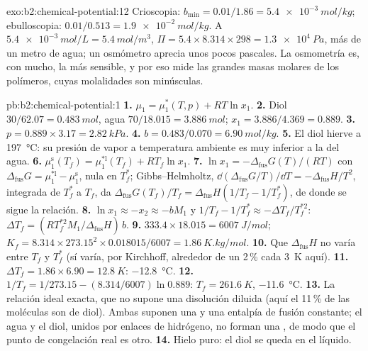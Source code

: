 \begin{solution}{exo:b2:chemical-potential:12}
Crioscopia: $b_{\min} = 0.01/1.86 = \qty{5.4e-3}{mol/kg}$; ebulloscopia:
$0.01/0.513 = \qty{1.9e-2}{mol/kg}$. A $\qty{5.4e-3}{mol/L} =
\qty{5.4}{mol/m^3}$, $\Pi = 5.4 \times 8.314 \times 298 = \qty{1.3e4}{Pa}$,
más de un metro de agua; un osmómetro aprecia unos pocos pascales. La osmometría es, con mucho,
la más sensible, y por eso mide las grandes masas molares de los
polímeros, cuyas molalidades son minúsculas.
\end{solution}

\begin{solution}{pb:b2:chemical-potential:1}
\textbf{1.} $\mu_1 = \mu_1^*(T, p) + RT\ln x_1$.
\textbf{2.} Diol $30/62.07 = \qty{0.483}{mol}$, agua $70/18.015 =
\qty{3.886}{mol}$; $x_1 = 3.886/4.369 = 0.889$.
\textbf{3.} $p = 0.889 \times 3.17 = \qty{2.82}{kPa}$.
\textbf{4.} $b = 0.483/0.070 = \qty{6.90}{mol/kg}$.
\textbf{5.} El diol hierve a \qty{197}{\celsius}: su presión de vapor a temperatura
ambiente es muy inferior a la del agua.
\textbf{6.} $\mu_1^{\text{s}}(T_f) = \mu_1^{*\text{l}}(T_f) + RT_f\ln x_1$.
\textbf{7.} $\ln x_1 = -\Delta_{\text{fus}}G(T)/(RT)$ con
$\Delta_{\text{fus}}G = \mu_1^{*\text{l}} - \mu_1^{\text{s}}$, nula en $T_f^*$;
Gibbs--Helmholtz, $\dd(\Delta_{\text{fus}}G/T)/\dd T = -\Delta_{\text{fus}}H/T^2$,
integrada de $T_f^*$ a $T_f$, da $\Delta_{\text{fus}}G(T_f)/T_f =
\Delta_{\text{fus}}H(1/T_f - 1/T_f^*)$, de donde se sigue la relación.
\textbf{8.} $\ln x_1 \approx -x_2 \approx -bM_1$ y $1/T_f - 1/T_f^* \approx
-\Delta T_f/T_f^{*2}$: $\Delta T_f = (RT_f^{*2}M_1/\Delta_{\text{fus}}H)\,b$.
\textbf{9.} $333.4 \times 18.015 = \qty{6007}{J/mol}$; $K_f = 8.314 \times
273.15^2 \times 0.018015/6007 = \qty{1.86}{K.kg/mol}$.
\textbf{10.} Que $\Delta_{\text{fus}}H$ no varía entre $T_f$ y
$T_f^*$ (sí varía, por Kirchhoff, alrededor de un 2\,\% cada \qty{3}{K} aquí).
\textbf{11.} $\Delta T_f = 1.86 \times 6.90 = \qty{12.8}{K}$: \qty{-12.8}{\celsius}.
\textbf{12.} $1/T_f = 1/273.15 - (8.314/6007)\ln 0.889$: $T_f = \qty{261.6}{K}$,
\qty{-11.6}{\celsius}.
\textbf{13.} La relación ideal exacta, que no supone una disolución
diluida (aquí el 11\,\% de las moléculas son de diol). Ambas suponen una 
y una entalpía de fusión constante; el agua y el diol, unidos por enlaces de hidrógeno,
no forman una , de modo que el punto de congelación real es otro.
\textbf{14.} Hielo puro: el diol se queda en el líquido.

\end{solution}
